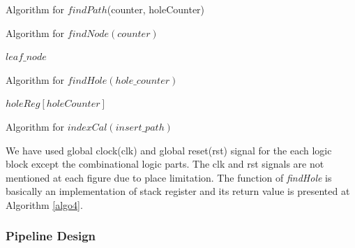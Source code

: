 \documentclass[10pt, conference, compsocconf]{IEEEtran}
\begin{document}
\begin{algorithm}
\caption{Algorithm for $findPath$(counter, holeCounter)}
\label{algo2}
\begin{algorithmic}[1]
    \ELSE
    \ENDIF
\end{algorithmic}
\end{algorithm}

\begin{algorithm}
\caption{Algorithm for $findNode(counter)$}
\label{algo3}
\begin{algorithmic}[1]
    \ENDFOR
    \RETURN $leaf\_node$
\end{algorithmic}
\end{algorithm}


\begin{algorithm}
\caption{Algorithm for $findHole(hole\_counter)$}
\label{algo4}
\begin{algorithmic}[1]
    \RETURN $holeReg[holeCounter]$
\end{algorithmic}
\end{algorithm}

\begin{algorithm}
\caption{Algorithm for $indexCal(insert\_path)$}
\label{algo5}
\begin{algorithmic}[1]
        \ELSE
        \ENDIF
    \ENDFOR
\end{algorithmic}
\end{algorithm}

We have used global clock(clk) and global reset(rst) signal for the each logic block except the combinational logic parts. The clk and rst signals are not mentioned at each figure due to place limitation. The function of {\it findHole} is basically an implementation of stack register and its return value is presented at Algorithm \ref{algo4}.



\subsubsection{Pipeline Design}
\end{document}
